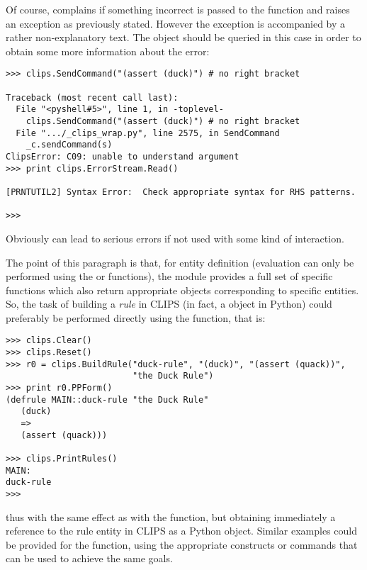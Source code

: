 Of course, \pyclips{} complains if something incorrect is passed to the
 function and raises an exception as previously
stated. However the exception is accompanied by a rather non-explanatory
text. The  object should be queried in this case in order
to obtain some more information about the error:

\begin{verbatim}
>>> clips.SendCommand("(assert (duck)")	# no right bracket

Traceback (most recent call last):
  File "<pyshell#5>", line 1, in -toplevel-
    clips.SendCommand("(assert (duck)")	# no right bracket
  File ".../_clips_wrap.py", line 2575, in SendCommand
    _c.sendCommand(s)
ClipsError: C09: unable to understand argument
>>> print clips.ErrorStream.Read()

[PRNTUTIL2] Syntax Error:  Check appropriate syntax for RHS patterns.

>>>
\end{verbatim}

Obviously  can lead to serious errors if not
used with some kind of interaction.

The point of this paragraph is that, for entity definition (evaluation
can only be performed using the  or 
functions), the \pyclips{} module provides a full set of specific
 functions which also return appropriate
objects corresponding to specific entities. So, the task of building a
\emph{rule} in CLIPS (in fact, a  object in Python) could
preferably be performed directly using the 
function, that is:

\begin{verbatim}
>>> clips.Clear()
>>> clips.Reset()
>>> r0 = clips.BuildRule("duck-rule", "(duck)", "(assert (quack))",
                         "the Duck Rule")
>>> print r0.PPForm()
(defrule MAIN::duck-rule "the Duck Rule"
   (duck)
   =>
   (assert (quack)))

>>> clips.PrintRules()
MAIN:
duck-rule
>>>
\end{verbatim}

thus with the same effect as with the  function, but
obtaining immediately a reference to the rule entity in CLIPS as a Python
object. Similar examples could be provided for the 
function, using the appropriate constructs or commands that can be used
to achieve the same goals.

